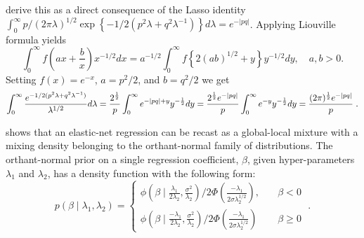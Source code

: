 \documentclass[lineno]{biometrika}
\begin{document}
\citet{polson_data_2011} derive this as a direct consequence of the Lasso identity $\int_0^{\infty} p/(2 \pi \lambda)^{1/2} \exp\left\{-1/2\left(p^2 \lambda+q^2 \lambda^{-1}\right)\right\} d\lambda = e^{-\lvert pq \rvert}$. Applying Liouville formula yields
\[
\int_{0}^{\infty} f\left(ax + \frac{b}{x} \right) x^{-1/2} dx = a^{-1/2} \int_{0}^{\infty} f\left\{ 2 (ab)^{1/2} + y \right\} y^{-1/2} dy, \quad a, b > 0.
\]
Setting $f(x) = e^{-x}$, $a = p^2/2$, and $b = q^2/2$ we get
\[
  \int_0^{\infty} \frac{e^{-1/2(p^2 \lambda + q^2 \lambda^{-1})}}{\lambda^{1/2}} d\lambda
  = \frac{2^{\frac{1}{2}}}{p} \int_0^{\infty} e^{-|pq| + y} y^{-\frac{1}{2}} d y = \frac{2^{\frac{1}{2}} e^{-|pq|}}{p} \int_0^{\infty} e^{-y} y^{-\frac{1}{2}} d y 
  = \frac{(2\pi)^{\frac{1}{2}} e^{-|pq|}}{p}
  \;.
\]

\citet{hans2011comment} shows that an elastic-net regression can be recast as a
global-local mixture with a mixing density belonging to the orthant-normal
family of distributions.  The orthant-normal prior on a single regression
coefficient, $\beta$, given hyper-parameters $\lambda_1$ and $\lambda_2$, 
has a density function with the following form:
\begin{equation}
  p(\beta \mid \lambda_1, \lambda_2)  = 
  \begin{cases} 
   \phi(\beta \mid \frac{\lambda_1}{2\lambda_2}, \frac{\sigma^2}{\lambda_2}) 
   / 2\Phi(\frac{-\lambda_1}{2\sigma \lambda_2^{1/2} }), & \quad \beta < 0 
   \\
   \phi(\beta \mid \frac{-\lambda_1}{2\lambda_2}, \frac{\sigma^2}{\lambda_2}) / 
   2\Phi(\frac{-\lambda_1}{2\sigma \lambda_2^{1/2} }) & \quad \beta \geq 0
  \end{cases} 
  \;.
  \label{eq:hans}
\end{equation}
\end{document}
